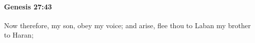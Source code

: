
		\paragraph{Genesis 27:43} %
			\label{GENESIS-27-43}

			Now therefore, my son, obey my voice; and arise, flee thou to Laban my brother to Haran;


